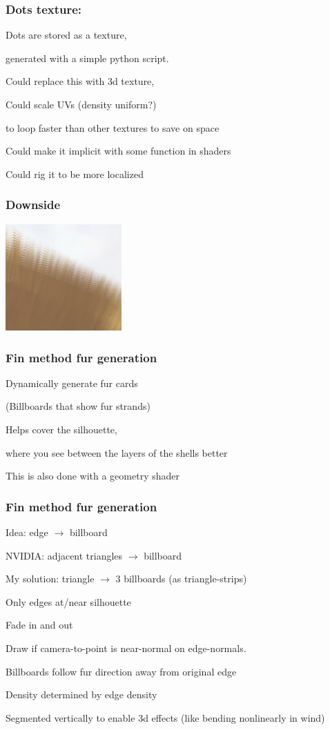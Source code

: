 \documentclass[12pt]{beamer}
\begin{document}
    \begin{frame}
        \frametitle{ Dots texture: }

        Dots are stored as a texture,

        generated with a simple python script.

        Could replace this with 3d texture,

        Could scale UVs (density uniform?)

        to loop faster than other textures to save on space

        Could make it implicit with some function in shaders

        Could rig it to be more localized
    \end{frame}

    \begin{frame}
        \frametitle{ Downside }

        \includegraphics[width=12em]{shellgaps}
    \end{frame}

    \begin{frame}
        \frametitle{ Fin method fur generation}
        Dynamically generate fur cards

        (Billboards that show fur strands)

        Helps cover the silhouette,

        where you see between the layers of the shells better

        This is also done with a geometry shader
    \end{frame}

    \begin{frame}
        \frametitle{ Fin method fur generation}

        Idea: edge $\rightarrow$ billboard

        NVIDIA: adjacent triangles $\rightarrow$ billboard

        My solution: triangle $\rightarrow$ 3 billboards (as triangle-strips)

        Only edges at/near silhouette

        Fade in and out

        Draw if camera-to-point is near-normal on edge-normals.

        Billboards follow fur direction away from original edge

        Density determined by edge density

        Segmented vertically to enable 3d effects (like bending nonlinearly in wind)

    \end{frame}
\end{document}
